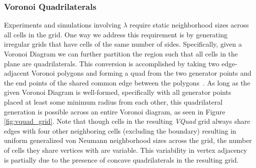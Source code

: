 \documentclass[a4paper,11pt]{article}
\begin{document}
\subsubsection{Voronoi Quadrilaterals}
\label{subsec:vquad}
Experiments and simulations involving $\lambda$ require static neighborhood sizes across all cells in the grid. One way we address this requirement is by generating irregular grids that have cells of the same number of sides. Specifically, given a Voronoi Diagram we can further partition the region such that all cells in the plane are quadrilaterals. This conversion is accomplished by taking two edge-adjacent Voronoi polygons and forming a quad from the two generator points and the end points of the shared common edge between the polygons~\cite{am10}. As long as the given Voronoi Diagram is well-formed, specifically with all generator points placed at least some minimum radius from each other, this quadrilateral generation is possible across an entire Voronoi diagram, as seen in Figure \ref{fig:vquad_grid}. Note that though cells in the resulting \textit{VQuad} grid always share edges with four other neighboring cells (excluding the boundary) resulting in uniform generalized von Neumann neighborhood sizes across the grid, the number of cells they share vertices with are variable. This variability in vertex adjacency is partially due to the presence of concave quadrilaterals in the resulting grid. %
%
\end{document}
